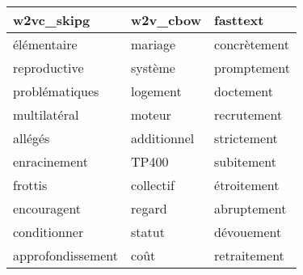 \begin{tabular}{lll}
\toprule
        w2vc\_skipg &     w2v\_cbow &      fasttext \\
\midrule
       élémentaire &      mariage &  concrètement \\
      reproductive &      système &   promptement \\
    problématiques &     logement &     doctement \\
      multilatéral &       moteur &   recrutement \\
           allégés &  additionnel &   strictement \\
      enracinement &        TP400 &    subitement \\
           frottis &    collectif &   étroitement \\
       encouragent &       regard &   abruptement \\
      conditionner &       statut &    dévouement \\
 approfondissement &         coût &  retraitement \\
\bottomrule
\end{tabular}
